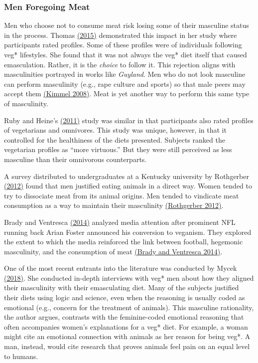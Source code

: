 \documentclass[twoside]{report}
\begin{document}
\begin{multicols*}{2}
\subsubsection{Men Foregoing Meat}

Men who choose not to consume meat risk losing some of their masculine
status in the process. Thomas \hyperlink{thomas}{(2015)} demonstrated this impact in her study where participants rated profiles. Some of these profiles were of individuals following veg* lifestyles. She found that it was not always the veg* diet itself that caused emasculation. Rather, it is the
\emph{choice} to follow it. This rejection aligns with masculinities
portrayed in works like \emph{Guyland}. Men who do not look masculine can perform masculinity (e.g., rape culture and sports) so that male peers may accept them \hyperlink{kimmel}{(Kimmel 2008)}. Meat is yet another way
to perform this same type of masculinity.

Ruby and Heine's \hyperlink{ruby}{(2011)} study was similar in that participants also rated profiles of vegetarians and omnivores. This study was unique, however, in that it controlled for the healthiness of the diets
presented. Subjects ranked the vegetarian profiles as ``more virtuous.''
But they were still perceived as less masculine than their omnivorous
counterparts.

A survey distributed to undergraduates at a Kentucky
university by Rothgerber \hyperlink{rothgerber}{(2012)} found that men justified eating animals in a direct way. Women tended to try to dissociate meat from its animal origins. Men tended to vindicate meat consumption as a way to maintain their masculinity \hyperlink{rothgerber}{(Rothgerber 2012)}. 

Brady and Ventresca \hyperlink{brady}{(2014)} analyzed media attention after prominent NFL running back Arian Foster announced his conversion to veganism. They explored the extent to which the media reinforced the link between football, hegemonic masculinity, and the consumption of meat \hyperlink{brady}{(Brady and Ventresca 2014)}.

One of the most recent entrants into the literature was conducted by
Mycek \hyperlink{mycek}{(2018)}. She conducted in-depth interviews with veg* men about how they aligned their masculinity with their emasculating diet. Many of the subjects justified their diets using logic and science, even when the reasoning is usually coded as emotional (e.g., concern for the treatment
of animals). This masculine rationality, the author argues, contrasts
with the feminine-coded emotional reasoning that often accompanies
women's explanations for a veg* diet. For example, a woman might cite an
emotional connection with animals as her reason for being veg*. A man, instead, would cite research that proves animals feel pain on an equal
level to humans.


\end{multicols*}
\end{document}
